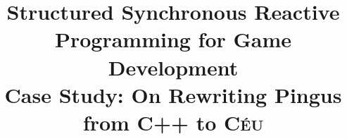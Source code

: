 \documentclass[10pt, conference, compsocconf]{IEEEtran}
\newcommand{\CEU}{\textsc{C\'{e}u}\xspace}
\begin{document}


\title{Structured Synchronous Reactive Programming for Game Development
        \\ \Large{Case Study: On Rewriting Pingus from C++ to \CEU}}

\end{document}
